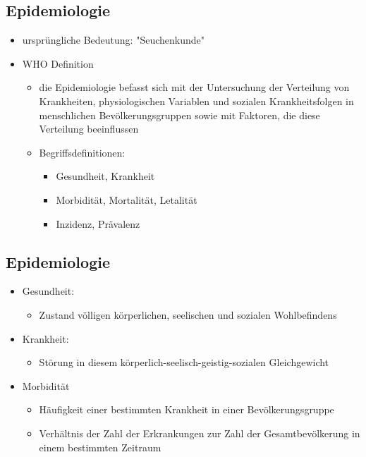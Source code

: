 \subsection{Epidemiologie}
	\begin{itemize}
		\item ursprüngliche Bedeutung: "Seuchenkunde"
		\item WHO Definition
			\begin{itemize}
				\item die Epidemiologie befasst sich mit der Untersuchung der Verteilung von Krankheiten, physiologischen Variablen und sozialen Krankheitsfolgen in menschlichen Bevölkerungsgruppen sowie mit Faktoren, die diese Verteilung beeinflussen
				\item Begriffsdefinitionen:
					\begin{itemize}
						\item Gesundheit, Krankheit
						\item Morbidität, Mortalität, Letalität
						\item Inzidenz, Prävalenz
					\end{itemize}
		\end{itemize}
	\end{itemize}

\subsection{Epidemiologie}
	\begin{itemize}
		\item Gesundheit:
			\begin{itemize}
				\item Zustand völligen körperlichen, seelischen und sozialen Wohlbefindens
			\end{itemize}
		\item Krankheit:
			\begin{itemize}
				\item Störung in diesem körperlich-seelisch-geistig-sozialen Gleichgewicht
			\end{itemize}
		\item Morbidität
			\begin{itemize}
				\item Häufigkeit einer bestimmten Krankheit in einer Bevölkerungsgruppe
				\item Verhältnis der Zahl der Erkrankungen zur Zahl der Gesamtbevölkerung in einem bestimmten Zeitraum
			\end{itemize}
	\end{itemize}

